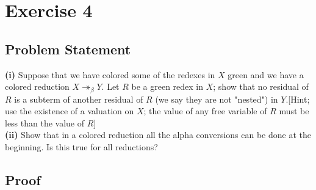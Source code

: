 \chapter{Exercise 4}
\lhead{\today}

\section{Problem Statement}
\textbf{(i)} Suppose that we have colored some of the redexes in $X$ green and we have a colored reduction $X \twoheadrightarrow_\beta Y$. Let $R$ be a green redex in $X$; show that no residual of $R$ is a subterm of another residual of $R$ (we say they are not "nested") in $Y$.[Hint; use the existence of a valuation on $X$; the value of any free variable of $R$ must be less than the value of $R$]\\

\textbf{(ii)} Show that in a colored reduction all the alpha conversions can be done at the beginning. Is this true for all reductions?

\section{Proof}
